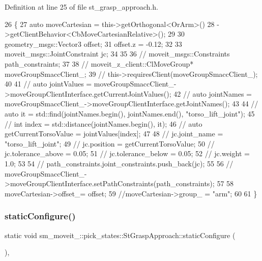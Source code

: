 Definition at line 25 of file st\+\_\+grasp\+\_\+approach.\+h.


\begin{DoxyCode}
26     \{
27         \textcolor{keyword}{auto} moveCartesian = this->getOrthogonal<OrArm>()
28                                 ->getClientBehavior<CbMoveCartesianRelative>();
29 
30         geometry\_msgs::Vector3 offset;
31         offset.z = -0.12;
32 
33         moveit\_msgs::JointConstraint jc;
34         
35 
36         \textcolor{comment}{// moveit\_msgs::Constraints path\_constraints;}
37 
38         \textcolor{comment}{// moveit\_z\_client::ClMoveGroup* moveGroupSmaccClient\_;}
39         \textcolor{comment}{// this->requiresClient(moveGroupSmaccClient\_);}
40 
41         \textcolor{comment}{// auto jointValues = moveGroupSmaccClient\_->moveGroupClientInterface.getCurrentJointValues();}
42         \textcolor{comment}{// auto jointNames = moveGroupSmaccClient\_->moveGroupClientInterface.getJointNames();}
43         
44         \textcolor{comment}{// auto it = std::find(jointNames.begin(), jointNames.end(), "torso\_lift\_joint");}
45         \textcolor{comment}{// int index = std::distance(jointNames.begin(), it);}
46         \textcolor{comment}{// auto getCurrentTorsoValue = jointValues[index];}
47 
48         \textcolor{comment}{// jc.joint\_name = "torso\_lift\_joint";  }
49         \textcolor{comment}{// jc.position = getCurrentTorsoValue;}
50         \textcolor{comment}{// jc.tolerance\_above = 0.05;}
51         \textcolor{comment}{// jc.tolerance\_below = 0.05;}
52         \textcolor{comment}{// jc.weight = 1.0; }
53         
54         \textcolor{comment}{// path\_constraints.joint\_constraints.push\_back(jc);}
55 
56         \textcolor{comment}{// moveGroupSmaccClient\_->moveGroupClientInterface.setPathConstraints(path\_constraints);}
57 
58         moveCartesian->offset\_= offset;
59         \textcolor{comment}{//moveCartesian->group\_ = "arm";}
60 
61     \}
\end{DoxyCode}
\mbox{\label{structsm__moveit__3_1_1pick__states_1_1StGraspApproach_ae692df25d8b4e0d175ba09399e680a4a}} 
\subsubsection{\texorpdfstring{static\+Configure()}{staticConfigure()}}
{\footnotesize\ttfamily static void sm\+\_\+moveit\+\_\+::pick\+\_\+states\+::\+St\+Grasp\+Approach\+::static\+Configure (\begin{DoxyParamCaption}{ }\end{DoxyParamCaption})\hspace{0.3cm}{\ttfamily [inline]}, {\ttfamily [static]}}




